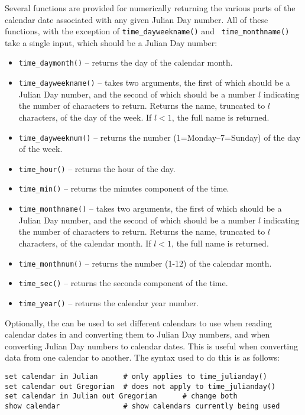 Several functions are provided for numerically returning the various parts of
the calendar date associated with any given Julian Day number. All of these
functions, with the exception of {\tt time\_\-dayweekname()} and {\tt
time\_\-monthname()} take a single input, which should be a Julian Day number:

\begin{itemize}
\item {\tt time\_daymonth()}     -- returns the day of the calendar month.
\item {\tt time\_dayweekname()}  -- takes two arguments, the first of which should be a Julian Day number, and the second of which should be a number $l$ indicating the number of characters to return. Returns the name, truncated to $l$ characters, of the day of the week. If $l<1$, the full name is returned.
\item {\tt time\_dayweeknum()}   -- returns the number (1=Monday--7=Sunday) of the day of the week.
\item {\tt time\_hour()}         -- returns the hour of the day.
\item {\tt time\_min()}          -- returns the minutes component of the time.
\item {\tt time\_monthname()}    -- takes two arguments, the first of which should be a Julian Day number, and the second of which should be a number $l$ indicating the number of characters to return. Returns the name, truncated to $l$ characters, of the calendar month. If $l<1$, the full name is returned.
\item {\tt time\_monthnum()}     -- returns the number (1-12) of the calendar month.
\item {\tt time\_sec()}          -- returns the seconds component of the time.
\item {\tt time\_year()}         -- returns the calendar year number.
\end{itemize}

Optionally, the  can be used to set different calendars
to use when reading calendar dates in and converting them to Julian Day
numbers, and when converting Julian Day numbers to calendar dates. This is
useful when converting data from one calendar to another. The syntax used to do
this is as follows:
\begin{verbatim}
set calendar in Julian      # only applies to time_julianday()
set calendar out Gregorian  # does not apply to time_julianday()
set calendar in Julian out Gregorian      # change both
show calendar               # show calendars currently being used
\end{verbatim}

